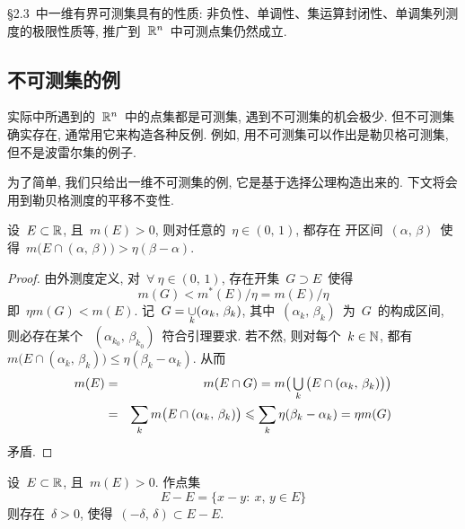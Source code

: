 \S2.3~中一维有界可测集具有的性质: 非负性、单调性、集运算封闭性、单调集列测度的极限性质等,
推广到~$\mathbb{R}^n$~中可测点集仍然成立.


\subsection{不可测集的例}

实际中所遇到的~$\mathbb{R}^n$~中的点集都是可测集, 遇到不可测集的机会极少. 但不可测集确实存在, 通常用它来构造各种反例. 例如, 用不可测集可以作出是勒贝格可测集, 但不是波雷尔集的例子.

为了简单, 我们只给出一维不可测集的例, 它是基于选择公理构造出来的. 下文将会用到勒贝格测度的平移不变性.

\begin{lemma} \label{lem251}
设~$E \subset \mathbb{R}$, 且~$m(E) > 0$, 则对任意的~$\eta \in (0,\,1)$, 都存在
开区间~$(\alpha,\,\beta)$~使得~$m\big(E \cap (\alpha,\,\beta) \big) >
\eta (\beta - \alpha)$.
\end{lemma}

\begin{proof}
由外测度定义, 对~$\forall~\eta \in (0,\,1)$, 存在开集~$G \supset E$~使得
\[
m(G) < m^*(E)/\eta = m(E) / \eta
\]
即~$\eta m(G) < m(E)$. 记~$G = \mathop{\cup}\limits_{k} (\alpha_k,\,\beta_k)$,
其中~$(\alpha_k,\,\beta_k)$~为~$G$~的构成区间, 则必存在某个
~$(\alpha_{k_0},\,\beta_{k_0})$~符合引理要求. 若不然, 则对每个~$k \in \mathbb{N}$,
都有~$m\big(E \cap (\alpha_k,\,\beta_k) \big) \leqslant \eta (\beta_k - \alpha_k)$. 从而
\begin{eqnarray*}
m(E) &=& m(E \cap G) = m \big( \mathop{\textstyle{\bigcup}}_k \big(E \cap (\alpha_k,\,\beta_k)\big) \big) \\
&=& \sum_k m\big(E \cap (\alpha_k,\,\beta_k)\big) \leqslant \sum_k \eta (\beta_k - \alpha_k) = \eta m(G)
\end{eqnarray*}
矛盾.
\end{proof}

\begin{lemma} \label{lem252}
设~$E \subset \mathbb{R}$, 且~$m(E) > 0$. 作点集
\[
E - E = \{x-y:\: x,\,y \in E\}
\]
则存在~$\delta > 0$, 使得~$(-\delta,\,\delta) \subset E - E$.
\end{lemma}


